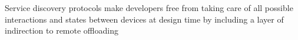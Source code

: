 %
%
%
%
%
%
%
%
%
%
Service discovery protocols make developers free from taking care of all
possible interactions and states between devices at design time by
including a layer of indirection to remote offloading
